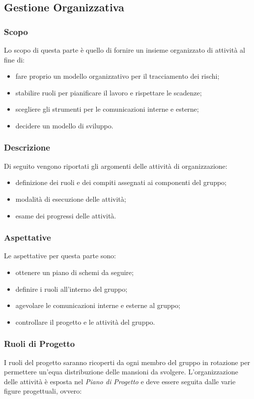 \subsection{Gestione Organizzativa}
\subsubsection{Scopo}
Lo scopo di questa parte è quello di fornire un insieme organizzato di attività al fine di:
\begin{itemize}
    \item fare proprio un modello organizzativo per il tracciamento dei rischi;
    \item stabilire ruoli per pianificare il lavoro e rispettare le scadenze;
    \item scegliere gli strumenti per le comunicazioni interne e esterne;
    \item decidere un modello di sviluppo.
\end{itemize}

\subsubsection{Descrizione}
Di seguito vengono riportati gli argomenti delle attività di organizzazione:
\begin{itemize}
    \item definizione dei ruoli e dei compiti assegnati ai componenti del gruppo;
    \item modalità di esecuzione delle attività;
    \item esame dei progressi delle attività.
\end{itemize}

\subsubsection{Aspettative}
Le aspettative per questa parte sono:
\begin{itemize}
    \item ottenere un piano di schemi da seguire;
    \item definire i ruoli all'interno del gruppo;
    \item agevolare le comunicazioni interne e esterne al gruppo;
    \item controllare il progetto e le attività del gruppo.
\end{itemize}

\subsubsection{Ruoli di Progetto}
I ruoli del progetto saranno ricoperti da ogni membro del gruppo in rotazione per permettere
un'equa distribuzione delle mansioni da svolgere. L'organizzazione delle attività
è esposta nel \emph{Piano di Progetto} e deve essere seguita dalle varie figure progettuali, ovvero:

